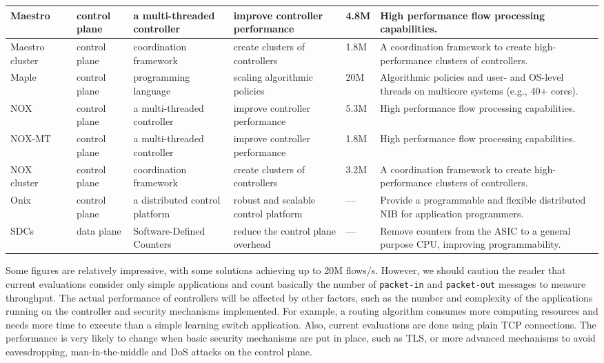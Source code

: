 {\begin{table}[!htp]
\begin{center}
\begin{tabularx}{\linewidth}{p{1.9cm}p{1.6cm}p{2.8cm}p{2.5cm}p{1.0cm}X}
Maestro~\cite{cai2011} & control plane & a multi-threaded controller & improve controller performance & 4.8M & High performance flow processing capabilities. \\\hline
Maestro cluster~\cite{yazici2012} & control plane & coordination framework & create clusters of controllers & 1.8M & A coordination framework to create high-performance clusters of controllers. \\\hline
Maple~\cite{voellmy2013} & control plane & programming language & scaling algorithmic policies & 20M & Algorithmic policies and user- and OS-level threads on multicore systems (e.g., 40+ cores). \\\hline
NOX~\cite{erickson2013} & control plane & a multi-threaded controller & improve controller performance & 5.3M & High performance flow processing capabilities. \\\hline
NOX-MT~\cite{tootoonchian2012} & control plane & a multi-threaded controller & improve controller performance & 1.8M & High performance flow processing capabilities. \\\hline
NOX cluster~\cite{yazici2012} & control plane & coordination framework & create clusters of controllers & 3.2M & A coordination framework to create high-performance clusters of controllers. \\\hline
Onix~\cite{koponen-1} & control plane & a distributed control platform & robust and scalable control platform & --- & Provide a programmable and flexible distributed NIB for application programmers.\\\hline
SDCs~\cite{mogul2012} & data plane & Software-Defined Counters & reduce the control plane overhead & --- & Remove counters from the ASIC to a general purpose CPU, improving programmability. \\\hline
\end{tabularx}
\end{center}
\end{table}
}


Some figures are relatively impressive, with some solutions achieving up to 20M flows/s. 
However, we should caution the reader that current evaluations consider only simple applications and count basically the number of \texttt{packet-in} and \texttt{packet-out} messages to measure throughput. 
The actual performance of controllers will be affected by other factors, such as the number and complexity of the applications running on the controller and security mechanisms implemented.
For example, a routing algorithm consumes more computing resources and needs more time to execute than a simple learning switch application.
Also, current evaluations are done using plain TCP connections.
The performance is very likely to change when basic security mechanisms are put in place, such as TLS, or more advanced mechanisms to avoid eavesdropping, man-in-the-middle and DoS attacks on the control plane.

